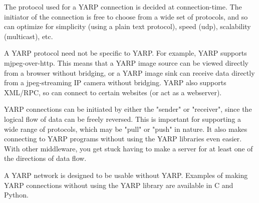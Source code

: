 \documentclass[letterpaper]{article}
\begin{document}
The protocol used for a YARP connection is decided at connection-time.
The initiator of the connection is free to choose from a wide set of
protocols, and so can optimize for simplicity (using a plain text
protocol), speed (udp), scalability (multicast), etc.

A YARP protocol need not be specific to YARP.  For example, YARP
supports mjpeg-over-http.  This means that a YARP image source can be
viewed directly from a browser without bridging, or a YARP image sink
can receive data directly from a jpeg-streaming IP camera without
bridging.  YARP also supports XML/RPC, so can connect to certain
websites (or act as a webserver).

YARP connections can be initiated by either the "sender" or
"receiver", since the logical flow of data can be freely reversed.
This is important for supporting a wide range of protocols, which may
be "pull" or "push" in nature.  It also makes connecting to YARP
programs without using the YARP libraries even easier.  With other
middleware, you get stuck having to make a server for at least one of
the directions of data flow.

A YARP network is designed to be usable without YARP.  Examples of
making YARP connections without using the YARP library are available
in C and Python.
\end{document}
